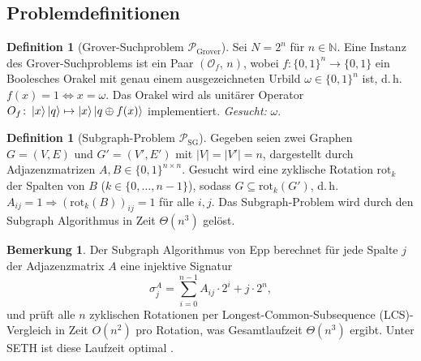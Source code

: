 ﻿\documentclass[11pt,a4paper]{article}
\theoremstyle{definition}
\newtheorem{definition}[theorem]{Definition}
\newtheorem{remark}[theorem]{Bemerkung}
\begin{document}
\subsection{Problemdefinitionen}
\label{subsec:probleme}

\begin{definition}[Grover-Suchproblem $\mathcal{P}_{\mathrm{Grover}}$]
\label{def:grover_problem}
  Sei $N = 2^n$ für $n \in \mathbb{N}$.  Eine Instanz des Grover-Suchproblems ist
  ein Paar $(\mathcal{O}_f,\, n)$, wobei
  $f \colon \{0,1\}^n \to \{0,1\}$ ein Boolesches Orakel mit genau einem
  ausgezeichneten Urbild $\omega \in \{0,1\}^n$ ist, d.\,h.\
  $f(x) = 1 \Leftrightarrow x = \omega$.
  Das Orakel wird als unitärer Operator $O_f \colon \ket{x}\ket{q} \mapsto \ket{x}\ket{q \oplus f(x)}$
  implementiert.  \emph{Gesucht:} $\omega$.
\end{definition}

\begin{definition}[Subgraph-Problem $\mathcal{P}_{\mathrm{SG}}$]
\label{def:sg_problem}
  Gegeben seien zwei Graphen $G = (V,E)$ und $G' = (V',E')$ mit
  $|V| = |V'| = n$, dargestellt durch Adjazenzmatrizen $A, B \in \{0,1\}^{n\times n}$.
  Gesucht wird eine zyklische Rotation $\mathrm{rot}_k$ der Spalten von $B$
  ($k \in \{0,\ldots,n-1\}$), sodass $G \subseteq \mathrm{rot}_k(G')$, d.\,h.\
  $A_{ij} = 1 \Rightarrow (\mathrm{rot}_k(B))_{ij} = 1$ für alle $i,j$.
  Das Subgraph-Problem wird durch den Subgraph Algorithmus \cite{Epp2026}
  in Zeit $\Theta(n^3)$ gelöst.
\end{definition}

\begin{remark}
  Der Subgraph Algorithmus von Epp \cite{Epp2026} berechnet für jede Spalte $j$
  der Adjazenzmatrix $A$ eine injektive Signatur
  \begin{equation}
    \sigma_j^A = \sum_{i=0}^{n-1} A_{ij} \cdot 2^i + j \cdot 2^n,
    \label{eq:signatur}
  \end{equation}
  und prüft alle $n$ zyklischen Rotationen per Longest-Common-Subsequence
  (LCS)-Vergleich in Zeit $O(n^2)$ pro Rotation, was Gesamtlaufzeit
  $\Theta(n^3)$ ergibt.  Unter SETH ist diese Laufzeit optimal \cite{Epp2026}.
\end{remark}
\end{document}
